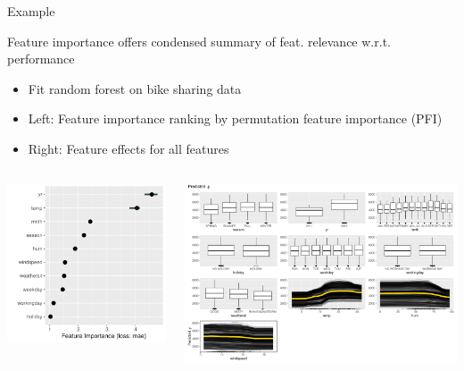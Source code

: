 \documentclass[11pt,compress,t,notes=noshow, aspectratio=169, xcolor=table]{beamer}
\begin{document}
\begin{frame}{Example}

Feature importance offers condensed summary of feat. relevance w.r.t. performance

\medskip

\begin{itemize}
    \item Fit random forest on bike sharing data
    \item Left: Feature importance ranking by permutation feature importance (PFI)
    \item Right: Feature effects for all features
\end{itemize}

\centering
\begin{columns}[c]
  \begin{column}{0.37\textwidth}
\includegraphics[width=.98\linewidth]{figure_man/bike_pfi}
\end{column}
  \begin{column}{0.63\textwidth}
  \includegraphics[width=\linewidth]{figure_man/bike_pdp+ice}

\end{column}
\end{columns}
\end{frame}
\end{document}
